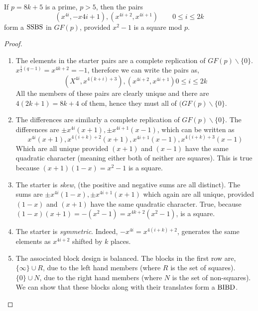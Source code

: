 \begin{lemma}
If $p = 8k + 5$ is a prime, $p > 5$, then the pairs
\begin{equation}
(x^{4i}, -x{4i + 1}), (x^{4i + 2}, x^{4i + 1}) \qquad 0 \leq i \leq 2k
\end{equation}
form a $\operatorname{SSBS}$ in $GF(p)$, provided $x^2 - 1$ is a square mod
$p$.
\end{lemma}
\begin{proof}
\begin{enumerate}
\item{The elements in the starter pairs are a complete
    replication of $GF(p) \backslash \{0\}$.
    $x^{\frac{1}{2} (q - 1)} = x^{4k + 2} = -1$, therefore we
    can write the pairs as,
    $$(X^{4i}, x^{4(k + i) + 3}), (x^{4i + 2}, x^{4i + 1}) 0 \leq i \leq 2k$$
    All the members of these pairs are clearly unique and
    there are $4(2k + 1) = 8k + 4$ of them, hence they must all of
    $(GF(p) \backslash \{0\}$.}
\item{The differences are similarly a complete replication of
    $GF(p) \backslash \{0\}$. The differences are
    $\pm x^{4i}(x + 1), \pm x^{4i + 1}(x - 1)$, which can be written
    as
    $$x^{4i}(x + 1), x^{4(i + k) + 2}(x + 1), x^{4i + 1}(x - 1), x^{4(i + k) + 3}(x-1)$$
    Which are all unique provided $(x + 1)$ and $(x - 1)$ have
    the same quadratic character (meaning either both of
    neither are squares).  This is true because
    $(x + 1)(1 - x) = x^2 - 1$ is a square.}
\item{The starter is \emph{skew}, (the positive and negative sums
    are all distinct).  The sums are
    $\pm x^{4i}(1 - x), \pm x^{4i + 1}(x + 1)$
    which again are all unique, provided
    $(1 - x)$ and $(x + 1)$ have the same quadratic
    character.  True, because
    $(1 - x)(x  +1) = -(x^2 - 1) = x^{4k + 2}(x^2  -1)$, is a square.}
\item{The starter is \emph{symmetric}.
    Indeed, $-x^{4i} = x^{4(i + k) + 2}$, generates the
    same elements as $x^{4i + 2}$ shifted by $k$ places.}
\item{The associated block design is balanced.  The blocks in
    the first row are, $\{\infty\} \cup R$, due to the left
    hand members (where $R$ is the set of squares).
    $\{0\} \cup N$, due to the right hand members (where
    $N$ is the set of non-squares).
    We can show that these blocks along with their translates
    form a $\operatorname{BIBD}$.
    
}
\end{enumerate}
\end{proof}
